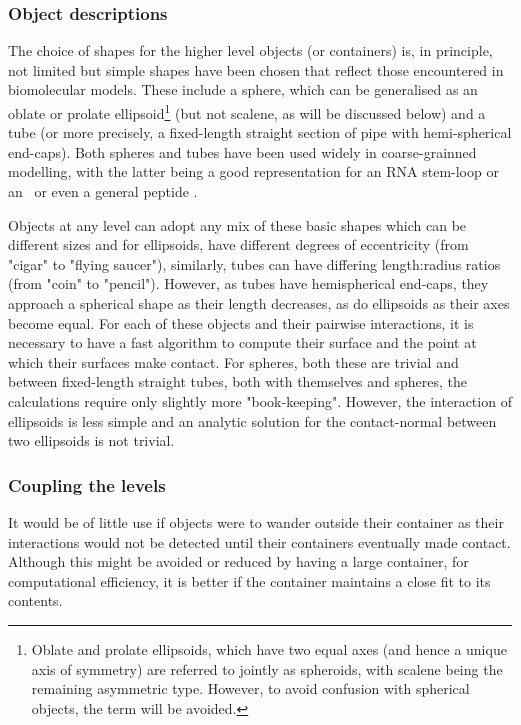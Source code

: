 \subsubsection{Object descriptions}
 
The choice of shapes for the higher level objects (or containers) is, in principle, not
limited but simple shapes have been chosen that reflect those encountered in biomolecular
models.   These include a sphere, which can be generalised as an oblate or prolate
ellipsoid\footnote{
Oblate and prolate ellipsoids, which have two equal axes (and hence a unique axis of symmetry)
are referred to jointly as spheroids, with scalene being the remaining asymmetric type.  
However, to avoid confusion with spherical objects, the term will be avoided.}
(but not scalene, as will be discussed below) and a tube (or more precisely, a fixed-length
straight section of pipe with hemi-spherical end-caps).  Both spheres and tubes have been
used widely in coarse-grainned modelling, with the latter being a good representation
for an RNA stem-loop or an \AH\ or even a general peptide \cite{VachaRet14}.

Objects at any level can adopt any mix of these basic shapes which can be different 
sizes and for ellipsoids, have different degrees of eccentricity (from "cigar" to "flying 
saucer"), similarly, tubes can have differing length:radius ratios (from "coin" to "pencil").
However, as tubes have hemispherical end-caps, they approach a spherical shape as their
length decreases, as do ellipsoids as their axes become equal.
For each of these objects and their pairwise interactions, it is necessary to have 
a fast algorithm to compute their surface and the point at which their surfaces
make contact.   For spheres, both these are trivial and between fixed-length straight
tubes, both with themselves and spheres, the calculations require only slightly more
"book-keeping".    However, the interaction of ellipsoids is less simple and an analytic
solution for the contact-normal between two ellipsoids is not trivial.

\subsubsection{Coupling the levels}

It would be of little use if objects were to wander outside their container as their
interactions would not be detected until their containers eventually made contact.
Although this might be avoided or reduced by having a large container, for computational
efficiency, it is better if the container maintains a close fit to its contents.

